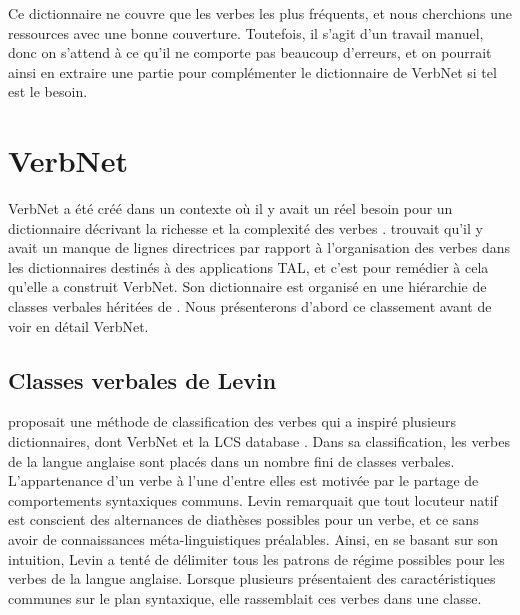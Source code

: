 Ce dictionnaire ne couvre que les verbes les plus fréquents, et nous cherchions une ressources avec une bonne couverture. Toutefois, il s'agit d'un travail manuel, donc on s'attend à ce qu'il ne comporte pas beaucoup d'erreurs, et on pourrait ainsi en extraire une partie pour complémenter le dictionnaire de VerbNet si tel est le besoin.


\section{VerbNet}

VerbNet a été créé dans un contexte où il y avait un réel besoin pour un dictionnaire décrivant la richesse et la complexité des verbes \citep{KipperClassBasedConstructionVerb2000}. \cite{SchulerVerbnetBroadcoverageComprehensive2005} trouvait qu'il y avait un manque de lignes directrices par rapport à l'organisation des verbes dans les dictionnaires destinés à des applications \ac{TAL}, et c'est pour remédier à cela qu'elle a construit VerbNet. Son dictionnaire est organisé en une hiérarchie de classes verbales héritées de \cite{verb-classes.levin.1993}. Nous présenterons d'abord ce classement avant de voir en détail VerbNet.

\subsection{Classes verbales de Levin}

\cite{verb-classes.levin.1993} proposait une méthode de classification des verbes qui a inspiré plusieurs dictionnaires, dont VerbNet \citep{SchulerVerbnetBroadcoverageComprehensive2005} et la LCS database \citep{AyanGeneratingParsingLexicon2002a,DorrUseLexicalSemantics1992}. Dans sa classification, les verbes de la langue anglaise sont placés dans un nombre fini de classes verbales. L'appartenance d'un verbe à l'une d'entre elles est motivée par le partage de comportements syntaxiques communs. Levin remarquait que tout locuteur natif est conscient des alternances de diathèses possibles pour un verbe, et ce sans avoir de connaissances méta-linguistiques préalables. Ainsi, en se basant sur son intuition, Levin a tenté de délimiter tous les patrons de régime possibles pour les verbes de la langue anglaise. Lorsque plusieurs présentaient des caractéristiques communes sur le plan syntaxique, elle rassemblait ces verbes dans une classe.

